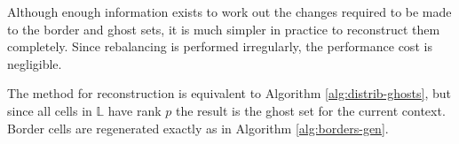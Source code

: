 \documentclass{IIBproject}
\begin{document}
Although enough information exists to work out the changes required to be made to the border and ghost sets, it is much simpler in practice to reconstruct them completely. Since rebalancing is performed irregularly, the performance cost is negligible. 

The method for reconstruction is equivalent to Algorithm \ref{alg:distrib-ghosts}, but since all cells in $\mathbb{L}$ have rank $p$ the result is the ghost set for the current context. Border cells are regenerated exactly as in Algorithm \ref{alg:borders-gen}.











\end{document}
